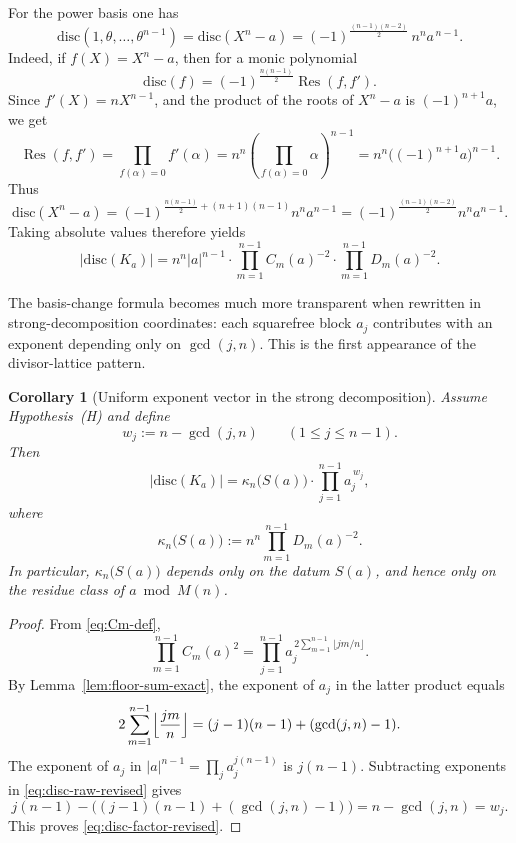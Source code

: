 \documentclass[11pt,letterpaper]{amsart}
\newcommand{\disc}{\mathrm{disc}}
\theoremstyle{plain}
\newtheorem{corollary}[theorem]{Corollary}
\theoremstyle{definition}
\begin{document}
For the power basis one has
\[
\disc(1,\theta,\dots,\theta^{n-1})
=
\disc(X^n-a)
=
(-1)^{\frac{(n-1)(n-2)}{2}}\,n^n a^{\,n-1}.
\]
Indeed, if \(f(X)=X^n-a\), then for a monic polynomial
\[
\disc(f)=(-1)^{\frac{n(n-1)}2}\operatorname{Res}(f,f').
\]
Since \(f'(X)=nX^{n-1}\), and the product of the roots of \(X^n-a\) is
\((-1)^{n+1}a\), we get
\[
\operatorname{Res}(f,f')
=
\prod_{f(\alpha)=0} f'(\alpha)
=
n^n\left(\prod_{f(\alpha)=0}\alpha\right)^{n-1}
=
n^n\bigl((-1)^{n+1}a\bigr)^{n-1}.
\]
Thus
\[
\disc(X^n-a)
=
(-1)^{\frac{n(n-1)}2+(n+1)(n-1)}n^n a^{n-1}
=
(-1)^{\frac{(n-1)(n-2)}2}n^n a^{n-1}.
\]
Taking absolute values therefore yields
\begin{equation}\label{eq:disc-raw-revised}
|\disc(K_a)|
=
n^n |a|^{n-1}\cdot
\prod_{m=1}^{n-1} C_m(a)^{-2}\cdot
\prod_{m=1}^{n-1} D_m(a)^{-2}.
\end{equation}

The basis-change formula becomes much more transparent when rewritten in strong-decomposition coordinates: each squarefree block \(a_j\) contributes with an exponent depending only on \(\gcd(j,n)\). This is the first appearance of the divisor-lattice pattern.


\begin{corollary}[Uniform exponent vector in the strong decomposition]
\label{cor:disc-exponent-vector-revised}
Assume Hypothesis~\textup{(H)} and define
\[
w_j:=n-\gcd(j,n)
\qquad (1\le j\le n-1).
\]
Then
\begin{equation}\label{eq:disc-factor-revised}
|\disc(K_a)|=\kappa_n\bigl(S(a)\bigr)\cdot \prod_{j=1}^{n-1} a_j^{\,w_j},
\end{equation}
where
\[
\kappa_n\bigl(S(a)\bigr):=n^n\prod_{m=1}^{n-1} D_m(a)^{-2}.
\]
In particular, $\kappa_n\bigl(S(a)\bigr)$ depends only on the datum $S(a)$, and hence only on the
residue class of $a\bmod M(n)$.
\end{corollary}

\begin{proof}
From \eqref{eq:Cm-def},
\[
\prod_{m=1}^{n-1} C_m(a)^2
=\prod_{j=1}^{n-1} a_j^{\,2\sum_{m=1}^{n-1}\lfloor jm/n\rfloor}.
\]
By Lemma~\ref{lem:floor-sum-exact}, the exponent of $a_j$ in the latter product equals
\[
2\sum_{m=1}^{n-1}\Bigl\lfloor\frac{jm}{n}\Bigr\rfloor
=(j-1)(n-1)+(\gcd(j,n)-1).
\]
The exponent of $a_j$ in $|a|^{n-1}=\prod_j a_j^{j(n-1)}$ is $j(n-1)$.
Subtracting exponents in \eqref{eq:disc-raw-revised} gives
\[
j(n-1)-\bigl((j-1)(n-1)+(\gcd(j,n)-1)\bigr)=n-\gcd(j,n)=w_j.
\]
This proves \eqref{eq:disc-factor-revised}.
\end{proof}
\end{document}

